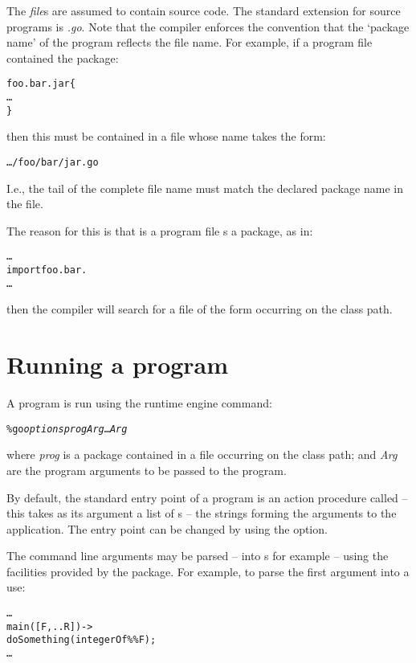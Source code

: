 The \emph{file}s are assumed to contain \go source code.  The standard extension for \go source programs is \emph{.go}. Note that the compiler enforces the convention that the `package name' of the program reflects the file name. For example, if a program file contained the package:
\begin{alltt}
foo.bar.jar\{
  \ldots
\}
\end{alltt}
then this must be contained in a file whose name takes the form:
\begin{alltt}
\ldots{}/foo/bar/jar.go
\end{alltt}
I.e., the tail of the complete file name must match the declared package name in the file.

The reason for this is that is a program file s a package, as in:
\begin{alltt}
\ldots{}
  import foo.bar.
\ldots{}
\end{alltt}
then the compiler will search for a file of the form  occurring on the class path.

\section{Running a \texorpdfstring{\go}{Go!} program}
\label{compile:run}

A \go program is run using the  runtime engine command:

\begin{alltt}
\% go \emph{options} \emph{prog} \emph{Arg} \ldots \emph{Arg\subn}
\end{alltt}

where \emph{prog} is a package contained in a file  occurring on the class path; and \emph{Arg\subi} are the program arguments to be passed to the \go program.


By default, the standard entry point of a program is an action procedure called  -- this takes as its argument a list of s -- the strings forming the arguments to the application. The entry point can be changed by using the  option.

\begin{aside}
The command line arguments may be parsed -- into s for example -- using the facilities provided by the  package. For example, to parse the first argument into a  use:
\begin{alltt}
\ldots
  main([F,..R]) ->
    doSomething(integerOf\%\%F);
    \ldots
\end{alltt}
\end{aside}

